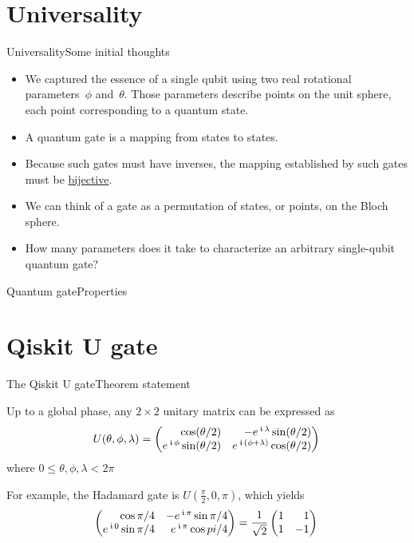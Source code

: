 \section*{Universality}
\begin{frame}{Universality}{Some initial thoughts}

\begin{itemize}[<+->]
    \item We captured the essence of a single qubit using two real rotational parameters~$\phi$ and~$\theta$.  Those parameters describe points on the unit sphere, each point corresponding to a quantum state.
    \item A quantum gate is a mapping from states to states.
    \item Because such gates must have inverses, the mapping established by such gates must be \href{https://en.wikipedia.org/wiki/Bijection}{bijective}.
    \item We can think of a gate as a permutation of states, or points, on the Bloch sphere.
    \item How many parameters does it take to characterize an arbitrary single-qubit quantum gate?
\end{itemize}

    
\end{frame}

\begin{frame}{Quantum gate}{Properties}

\BigSkip{}
    
\end{frame}

\section*{Qiskit U gate}
\begin{frame}{The Qiskit U gate}{Theorem statement}
\begin{theorem}
   Up to a global phase, any $2\times 2$ unitary matrix can be expressed as
    \[
    U(\theta, \phi, \lambda) = 
    \UGate{}
    \] where
    $0 \leq \theta,\phi,\lambda < 2\pi$
    \end{theorem}
    For example, the Hadamard gate \HMatrix{} is $U(\frac{\pi}{2}, 0, \pi)$, which yields
    \[
    \SQBG{\relax}{\cos \pi/4}{-\ExpPhase{\pi}\sin \pi/4}{\ExpPhase{0}\sin \pi/4}{\ExpPhase{\pi}\cos pi/4} = \HMatrix{}
    \]

\end{frame}

